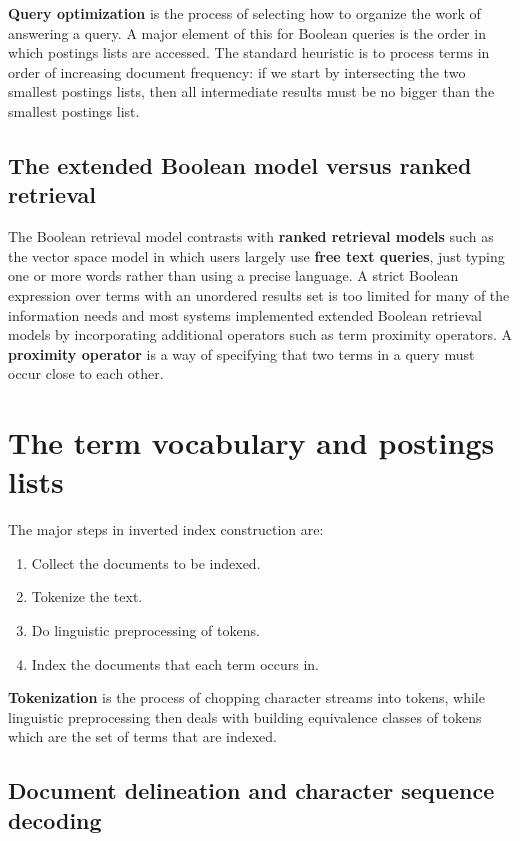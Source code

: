 \documentclass[letterpaper,11pt]{article}
\begin{document}
\textbf{Query optimization} is the process of selecting how to organize the work of answering a query. A major element of this for Boolean queries is the order in which postings lists are accessed. The standard heuristic is to process terms in order of increasing document frequency: if we start by intersecting the two smallest postings lists, then all intermediate results must be no bigger than the smallest postings list.

\subsection{The extended Boolean model versus ranked retrieval}

The Boolean retrieval model contrasts with \textbf{ranked retrieval models} such as the vector space model in which users largely use \textbf{free text queries}, just typing one or more words rather than using a precise language. A strict Boolean expression over terms with an unordered results set is too limited for many of the information needs and most systems implemented extended Boolean retrieval models by incorporating additional operators such as term proximity operators. A \textbf{proximity operator} is a way of specifying that two terms in a query must occur close to each other.

\section{The term vocabulary and postings lists}

The major steps in inverted index construction are:
\begin{enumerate}
    \item Collect the documents to be indexed. 
    \item Tokenize the text.
    \item Do linguistic preprocessing of tokens.
    \item Index the documents that each term occurs in.
\end{enumerate}
\textbf{Tokenization} is the process of chopping character streams into tokens, while linguistic preprocessing then deals with building equivalence classes of tokens which are the set of terms that are indexed.

\subsection{Document delineation and character sequence decoding}
\end{document}
